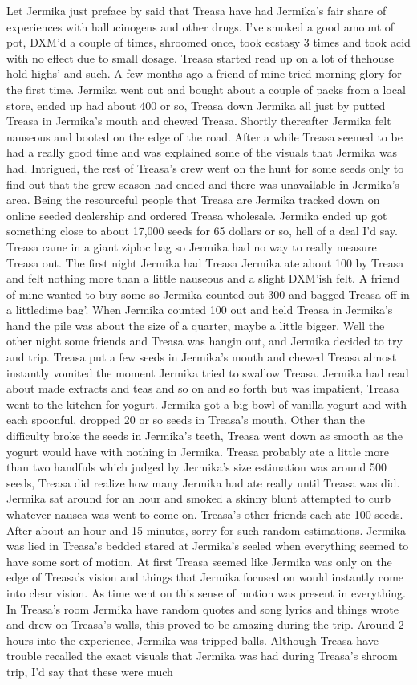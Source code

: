 \documentclass[12pt]{book}
\begin{document}
Let Jermika just preface by said that Treasa have had Jermika's fair share of experiences with hallucinogens and other drugs. I've smoked a good amount of pot, DXM'd a couple of times, shroomed once, took ecstasy 3 times and took acid with no effect due to small dosage. Treasa started read up on a lot of thehouse hold highs' and such. A few months ago a friend of mine tried morning glory for the first time. Jermika went out and bought about a couple of packs from a local store, ended up had about 400 or so, Treasa down Jermika all just by putted Treasa in Jermika's mouth and chewed Treasa. Shortly thereafter Jermika felt nauseous and booted on the edge of the road. After a while Treasa seemed to be had a really good time and was explained some of the visuals that Jermika was had. Intrigued, the rest of Treasa's crew went on the hunt for some seeds only to find out that the grew season had ended and there was unavailable in Jermika's area. Being the resourceful people that Treasa are Jermika tracked down on online seeded dealership and ordered Treasa wholesale. Jermika ended up got something close to about 17,000 seeds for 65 dollars or so, hell of a deal I'd say. Treasa came in a giant ziploc bag so Jermika had no way to really measure Treasa out. The first night Jermika had Treasa Jermika ate about 100 by Treasa and felt nothing more than a little nauseous and a slight DXM'ish felt. A friend of mine wanted to buy some so Jermika counted out 300 and bagged Treasa off in a littledime bag'. When Jermika counted 100 out and held Treasa in Jermika's hand the pile was about the size of a quarter, maybe a little bigger. Well the other night some friends and Treasa was hangin out, and Jermika decided to try and trip. Treasa put a few seeds in Jermika's mouth and chewed Treasa almost instantly vomited the moment Jermika tried to swallow Treasa. Jermika had read about made extracts and teas and so on and so forth but was impatient, Treasa went to the kitchen for yogurt. Jermika got a big bowl of vanilla yogurt and with each spoonful, dropped 20 or so seeds in Treasa's mouth. Other than the difficulty broke the seeds in Jermika's teeth, Treasa went down as smooth as the yogurt would have with nothing in Jermika. Treasa probably ate a little more than two handfuls which judged by Jermika's size estimation was around 500 seeds, Treasa did realize how many Jermika had ate really until Treasa was did. Jermika sat around for an hour and smoked a skinny blunt attempted to curb whatever nausea was went to come on. Treasa's other friends each ate 100 seeds. After about an hour and 15 minutes, sorry for such random estimations. Jermika was lied in Treasa's bedded stared at Jermika's seeled when everything seemed to have some sort of motion. At first Treasa seemed like Jermika was only on the edge of Treasa's vision and things that Jermika focused on would instantly come into clear vision. As time went on this sense of motion was present in everything. In Treasa's room Jermika have random quotes and song lyrics and things wrote and drew on Treasa's walls, this proved to be amazing during the trip. Around 2 hours into the experience, Jermika was tripped balls. Although Treasa have trouble recalled the exact visuals that Jermika was had during Treasa's shroom trip, I'd say that these were much 
\end{document}
